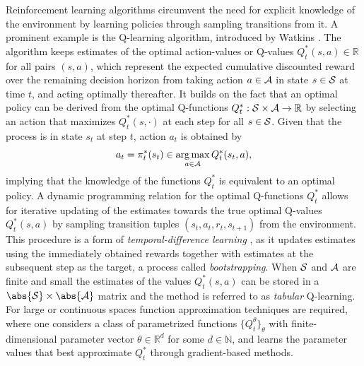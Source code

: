 \documentclass[
    a4paper,
    11pt,
    bibliography=totoc,
    listof=totoc,      
    headinclude=true,
    cleardoublepage=empty,
]{scrbook}
\theoremstyle{plain}
\theoremstyle{definition}
\theoremstyle{remark}
\newcommand{\SetR}{\mathbb R}
\newcommand{\SetN}{\mathbb N}
\newcommand{\SpaceS}{{\cal S}}
\newcommand{\SpaceA}{{\cal A}}
\DeclareMathOperator*{\argmax}{arg\,max}
\begin{document}
Reinforcement learning algorithms circumvent the need for explicit knowledge 
of the environment by learning policies through sampling transitions from it. A prominent example is the Q-learning algorithm, introduced by 
Watkins \cite{watkins1989_lfdr,watkins1992_q}. The algorithm keeps estimates of 
the optimal action-values or Q-values $Q^*_t(s,a)\in\SetR$ for all pairs $(s,a)$, which represent the expected cumulative discounted reward over the remaining decision horizon from taking action 
$a\in\SpaceA$ in state $s\in\SpaceS$ at time $t$, and acting optimally 
thereafter. It builds on the fact that an optimal policy can be 
derived from the optimal Q-functions $Q_t^*:\SpaceS\times\SpaceA\to\SetR$ by selecting an action that maximizes $Q^*_t(s,\cdot)$ at each step for all $s\in\SpaceS$. Given that the process is in state $s_t$ at step $t$, action $a_t$ is obtained by
\begin{equation}
\label{eq:IntroductionMDPMaximizingPolicy}
    a_t = \pi_t^*(s_t) \in \argmax_{a\in\SpaceA} Q^*_t(s_t,a),
\end{equation}
implying that the knowledge of the functions $Q^*_t$ is equivalent to 
an optimal policy. A dynamic programming relation for the optimal Q-functions 
$Q_t^*$ allows for iterative updating of the estimates towards the true optimal Q-values $Q^*_t(s,a)$ by sampling transition tuples $(s_t,a_t,r_t,s_{t+1})$ from 
the environment. This procedure is a form of \textit{temporal-difference 
learning} \cite[Chapter~6]{sutton2018_rli}, as it updates estimates using the 
immediately obtained rewards together with estimates at the subsequent step as the 
target, a process called \textit{bootstrapping}. When $\SpaceS$ and $\SpaceA$ 
are finite and small the estimates of the values $Q^*_t(s,a)$ can be stored in 
a $\abs{\SpaceS}\times\abs{\SpaceA}$ matrix and the method is referred to as 
\textit{tabular} Q-learning. For large or continuous spaces function 
approximation techniques are required, where one considers a class of 
parametrized functions $\{Q^\theta_t\}_\theta$ with finite-dimensional 
parameter vector $\theta\in\SetR^d$ for some $d\in\SetN$, and learns the 
parameter values that best approximate $Q_t^*$ through gradient-based methods.
\end{document}
